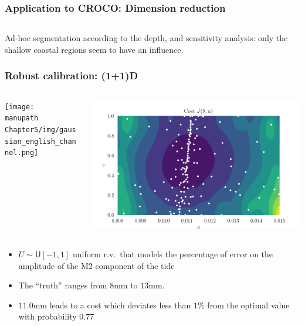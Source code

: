 \documentclass[11pt]{beamer}
\newcommand{\UU}{U}
\newcommand\manupath{/home/victor/acadwriting/Manuscrit/Text/}
\begin{document}
\begin{frame}
  \frametitle{Application to CROCO: Dimension reduction}
  \begin{center}
  \renewcommand\rmfamily{\sffamily}
  \begin{columns}
    \begin{column}{.5\textwidth}
    \end{column}
    \begin{column}{.5\textwidth}
       \resizebox{\textwidth}{!}{}
    \end{column}
  \end{columns}
  \end{center}
Ad-hoc segmentation according to the depth, and sensitivity analysis: only the shallow coastal regions seem to have an influence.
\end{frame}
\begin{frame}
  \frametitle{Robust calibration: (1+1)D}
  \begin{center}
    \begin{columns}
      \begin{column}{.5\textwidth}
  \texttt{[image: \\manupath Chapter5/img/gaussian\_english\_channel.png]}
\end{column}
\begin{column}{.5\textwidth}
  \includegraphics[width=\textwidth]{croco.png}
\end{column}
\end{columns}
\end{center}

  \begin{itemize}
  \item $\UU\sim \mathsf{U}[-1, 1]$ uniform r.v.\ that models the percentage of error on the amplitude of the M2 component of the tide
  \item The ``truth'' ranges from $8$mm to $13$mm.
  \item $11.0$mm leads to a cost which deviates less than $1\%$ from the optimal value with probability $0.77$
\end{itemize}
\end{frame}
\end{document}
